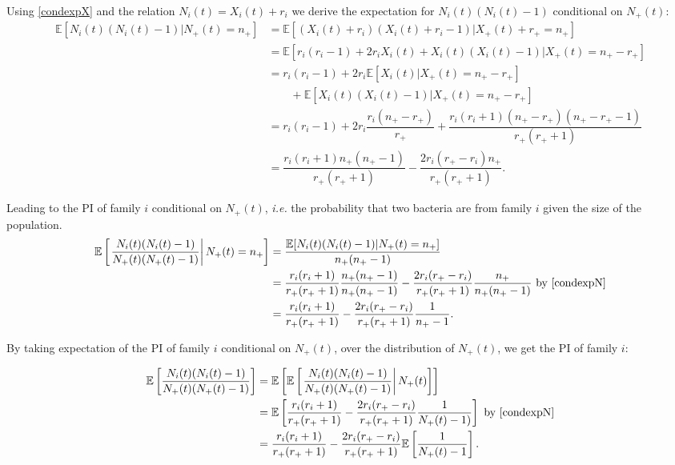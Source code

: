 \documentclass{article}
\begin{document}
Using \eqref{condexpX} and the relation $N_i(t)=X_i(t)+r_i$ we derive the expectation for $N_i(t)(N_i(t)-1)$ conditional on $N_+(t)$:
\begin{align}
 \mathbb{E} [ N_i(t)(N_i(t)-1) \vert N_+(t)=n_+ ] &= \mathbb{E} [ ( X_i(t)+r_i)(X_i(t)+r_i -1) \vert X_+(t)+ r_+ = n_+ ] \\
 &= \mathbb{E} [r_i(r_i-1) + 2r_i X_i(t) + X_i(t)(X_i(t)-1) \vert X_+(t)=n_+ - r_+ ]\\
 &= r_i(r_i-1) + 2 r_i \mathbb{E} [ X_i(t) \vert X_+(t)=n_+ - r_+ ]\\
 & \qquad + \mathbb{E} [X_i(t)(X_i(t)-1) \vert X_+(t)=n_+ - r_+ ]\\
  &= r_i(r_i-1) + 2 r_i \dfrac{r_i (n_+ - r_+)}{r_+ } + \dfrac{r_i(r_i+1) (n_+ - r_+) ( n_+ - r_+ -1 ) }{r_+ (r_+ +1 )}\\
 &=\dfrac{r_i(r_i+1) n_+ ( n_+ -1 ) }{r_+ (r_+ +1)} -\dfrac{2 r_{i} (r_+ - r_i) n_+ }{r_+ (r_+ +1)}. \label{condexpN}
\end{align}
 
Leading to the PI of family $i$ conditional on $N_+(t)$, \textit{i.e.} the probability that two bacteria are from family $i$ given the size of the population. 
\begin{align}
  \mathbb{E}\left[ \left. \dfrac{N_i(t)(N_i(t)-1)}{N_+(t)( N_+(t)-1 ) } \right\vert N_+(t)=n_+ \right] &= 
 \dfrac{\mathbb{E}[ N_i(t)(N_i(t)-1) \vert N_+(t)=n_+] }{n_+ (n_+ -1 ) }  \\
 &=\dfrac{r_i(r_i+1)}{r_+ (r_+ +1)} \dfrac{n_+ (n_+ -1 ) }{ n_+ (n_+ -1 ) }- \dfrac{2 r_i (r_+ -r_{i})}{r_+ (r_+ +1)} \dfrac{n_+}{ n_+ (n_+ -1 ) } \text{ by \eqref{condexpN}}\\
 &=\dfrac{r_i(r_i+1)}{r_+ (r_+ +1)}- \dfrac{2 r_i (r_+ -r_{i})}{r_+ (r_+ +1)} \dfrac{1}{ n_+ -1  }. \label{RelatednesscondexpN}
\end{align}

By taking expectation of the PI of family $i$ conditional on $N_+(t)$, over the distribution of $N_+(t)$, we get the PI of family $i$:

\begin{align}
\mathbb{E}\left[ \dfrac{N_i(t)(N_i(t)-1)}{N_+(t) ( N_+(t)-1 )} \right] &= 
 \mathbb{E}\left[ \mathbb{E}\left[ \left. \dfrac{N_i(t)(N_i(t)-1)}{N_+(t)( N_+(t)-1 ) } \right\vert N_+(t) \right] \right]\\
 &=\mathbb{E}\left[\dfrac{r_i(r_i+1)}{r_+ (r_+ +1)}- \dfrac{2 r_i (r_+ -r_{i})}{r_+ (r_+ +1)} \dfrac{1}{N_+(t)-1) } \right] \text{ by \eqref{condexpN}}\\
 &=\dfrac{r_i(r_i+1)}{r_+ (r_+ +1 )}-\dfrac{2 r_i (r_+ -r_{i})}{r_+ (r_+ +1 )}\mathbb{E}\left[\dfrac{1}{N_+(t)-1} \right].
\end{align}
\end{document}
